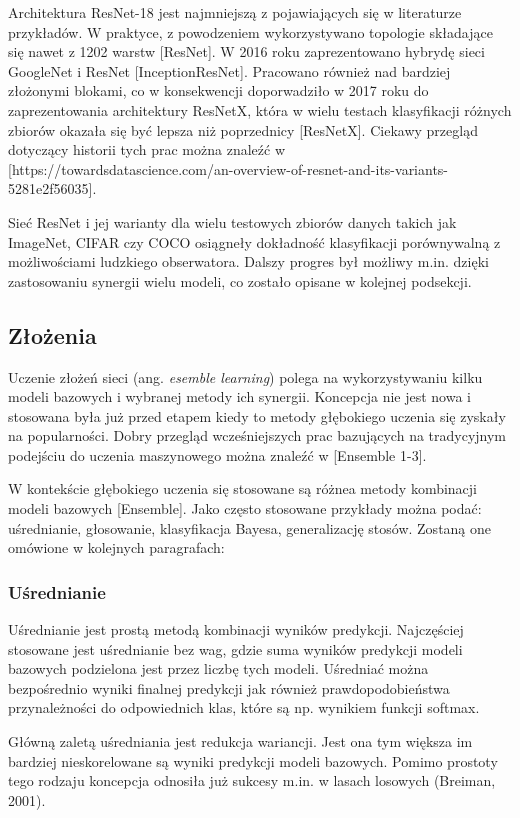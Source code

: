 Architektura ResNet-18 jest najmniejszą z pojawiających się w literaturze przykładów. W praktyce, z powodzeniem wykorzystywano topologie składające się nawet z 1202 warstw [ResNet]. W 2016 roku zaprezentowano hybrydę sieci GoogleNet i ResNet [InceptionResNet]. Pracowano również nad bardziej złożonymi blokami, co w konsekwencji doporwadziło w 2017 roku do zaprezentowania architektury ResNetX, która w wielu testach klasyfikacji różnych zbiorów okazała się być lepsza niż poprzednicy [ResNetX]. Ciekawy przegląd dotyczący historii tych prac można znaleźć w [https://towardsdatascience.com/an-overview-of-resnet-and-its-variants-5281e2f56035].

Sieć ResNet i jej warianty dla wielu testowych zbiorów danych takich jak ImageNet, CIFAR czy COCO osiągneły dokładność klasyfikacji porównywalną z możliwościami ludzkiego obserwatora. Dalszy progres był możliwy m.in. dzięki zastosowaniu synergii wielu modeli, co zostało opisane w kolejnej podsekcji.

\subsection{Złożenia}
Uczenie złożeń sieci (ang. \textit{esemble learning}) polega na wykorzystywaniu kilku modeli bazowych i wybranej metody ich synergii. Koncepcja nie jest nowa i stosowana była już przed etapem kiedy to metody głębokiego uczenia się zyskały na popularności. Dobry przegląd wcześniejszych prac bazujących na tradycyjnym podejściu do uczenia maszynowego można znaleźć w  [Ensemble 1-3].

W kontekście głębokiego uczenia się stosowane są różnea metody kombinacji modeli bazowych [Ensemble]. Jako często stosowane przykłady można podać: uśrednianie, głosowanie, klasyfikacja Bayesa, generalizację stosów. Zostaną one omówione w kolejnych paragrafach:

\subsubsection{Uśrednianie}
Uśrednianie jest prostą metodą kombinacji wyników predykcji. Najczęściej stosowane jest uśrednianie bez wag, gdzie suma wyników predykcji modeli bazowych podzielona jest przez liczbę tych modeli. Uśredniać można bezpośrednio wyniki finalnej predykcji jak również prawdopodobieństwa przynależności do odpowiednich klas, które są np. wynikiem funkcji softmax. 

Główną zaletą uśredniania jest redukcja wariancji. Jest ona tym większa im bardziej nieskorelowane są wyniki predykcji modeli bazowych. Pomimo prostoty tego rodzaju koncepcja odnosiła już sukcesy m.in. w lasach losowych (Breiman, 2001).

